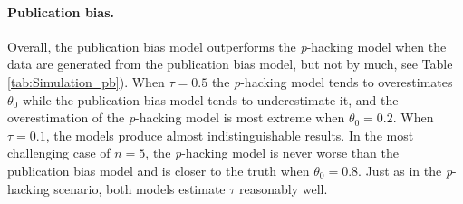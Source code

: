 \documentclass[useAMS,usenatbib,referee]{biom}
\begin{document}
\paragraph{Publication bias.} 
Overall, the publication bias model outperforms the \textit{p}-hacking model when the data are generated from the publication bias model, but not by much, see Table \ref{tab:Simulation_pb}). When $\tau = 0.5$ the \textit{p}-hacking model tends to overestimates $\theta_0$ while the publication bias model tends to underestimate it, and the overestimation of the \textit{p}-hacking model is most extreme when $\theta_0 = 0.2$. When $\tau = 0.1$, the models produce almost indistinguishable results. In the most challenging case of $n=5$, the \textit{p}-hacking model is never worse than the publication bias model and is closer to the truth when $\theta_0 = 0.8$. Just as in the \textit{p}-hacking scenario, both models estimate $\tau$ reasonably well.
\end{document}
